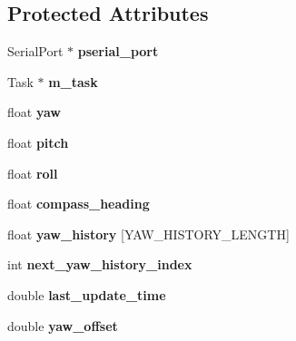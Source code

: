 \subsection*{Protected Attributes}
\begin{DoxyCompactItemize}
\item 
\hypertarget{class_i_m_u_a3051ad2cef2cd87af8da5b9d84ec4617}{}Serial\+Port $\ast$ {\bfseries pserial\+\_\+port}\label{class_i_m_u_a3051ad2cef2cd87af8da5b9d84ec4617}

\item 
\hypertarget{class_i_m_u_ae3b704880e2a11a2e6b4e39737b6cd20}{}Task $\ast$ {\bfseries m\+\_\+task}\label{class_i_m_u_ae3b704880e2a11a2e6b4e39737b6cd20}

\item 
\hypertarget{class_i_m_u_abafcc13ad5e5bbe902188b5d15b83240}{}float {\bfseries yaw}\label{class_i_m_u_abafcc13ad5e5bbe902188b5d15b83240}

\item 
\hypertarget{class_i_m_u_afbeac482b873f4eabfc8f85009ce2c42}{}float {\bfseries pitch}\label{class_i_m_u_afbeac482b873f4eabfc8f85009ce2c42}

\item 
\hypertarget{class_i_m_u_acd6447159ca43d07412eedd0ae1ace58}{}float {\bfseries roll}\label{class_i_m_u_acd6447159ca43d07412eedd0ae1ace58}

\item 
\hypertarget{class_i_m_u_ab2505b0243397689c271de042a913536}{}float {\bfseries compass\+\_\+heading}\label{class_i_m_u_ab2505b0243397689c271de042a913536}

\item 
\hypertarget{class_i_m_u_a4cb351f7a90d95a399c83e23f916fbb6}{}float {\bfseries yaw\+\_\+history} \mbox{[}Y\+A\+W\+\_\+\+H\+I\+S\+T\+O\+R\+Y\+\_\+\+L\+E\+N\+G\+T\+H\mbox{]}\label{class_i_m_u_a4cb351f7a90d95a399c83e23f916fbb6}

\item 
\hypertarget{class_i_m_u_a39770f45709b018ab4caa1c7c7b950d9}{}int {\bfseries next\+\_\+yaw\+\_\+history\+\_\+index}\label{class_i_m_u_a39770f45709b018ab4caa1c7c7b950d9}

\item 
\hypertarget{class_i_m_u_af6e9bbef741b76157a0d7c4db722f525}{}double {\bfseries last\+\_\+update\+\_\+time}\label{class_i_m_u_af6e9bbef741b76157a0d7c4db722f525}

\item 
\hypertarget{class_i_m_u_aeed5a2a480ebd5dcad81192c39712ef4}{}double {\bfseries yaw\+\_\+offset}\label{class_i_m_u_aeed5a2a480ebd5dcad81192c39712ef4}


\end{DoxyCompactItemize}
